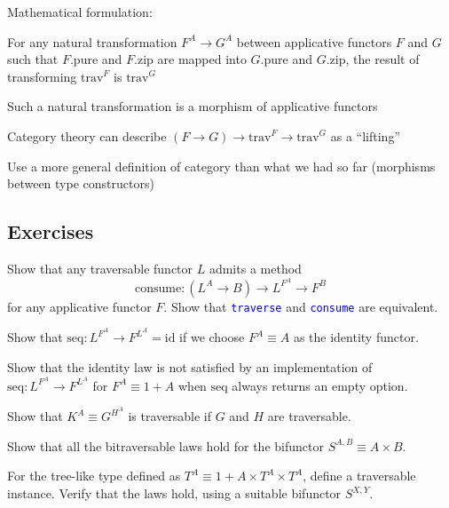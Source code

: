 Mathematical formulation:

For any natural transformation $F^{A}\rightarrow G^{A}$ between applicative
functors $F$ and $G$ such that $F.\text{pure}$ and $F.\text{zip}$
are mapped into $G.\text{pure}$ and $G.\text{zip}$, the result of
transforming $\text{trav}^{F}$ is $\text{trav}^{G}$

Such a natural transformation is a morphism of applicative functors

Category theory can describe {\footnotesize{}$\left(F\rightarrow G\right)\rightarrow\text{trav}^{F}\rightarrow\text{trav}^{G}$}
as a ``lifting''

Use a more general definition of category than what we had so far
(morphisms between type constructors)


\subsection{Exercises}

{\footnotesize{}\vspace{-0.15cm}Show that any traversable functor
$L$ admits a method 
\[
\text{consume}:(L^{A}\rightarrow B)\rightarrow L^{F^{A}}\rightarrow F^{B}
\]
for any applicative functor $F$. Show that }\texttt{\textcolor{blue}{\footnotesize{}traverse}}{\footnotesize{}
and }\texttt{\textcolor{blue}{\footnotesize{}consume}}{\footnotesize{}
are equivalent.}{\footnotesize\par}

{\footnotesize{}Show that $\text{seq}:L^{F^{A}}\rightarrow F^{L^{A}}=\text{id}$
if we choose $F^{A}\equiv A$ as the identity functor. }{\footnotesize\par}

{\footnotesize{}Show that the identity law is not satisfied by an
implementation of $\text{seq}:L^{F^{A}}\rightarrow F^{L^{A}}$ for
$F^{A}\equiv1+A$ when $\text{seq}$ always returns an empty option.}{\footnotesize\par}

{\footnotesize{}Show that $K^{A}\equiv G^{H^{A}}$ is traversable
if $G$ and $H$ are traversable.}{\footnotesize\par}

{\footnotesize{}Show that all the bitraversable laws hold for the
bifunctor $S^{A,B}\equiv A\times B$.}{\footnotesize\par}

{\footnotesize{}For the tree-like type defined as $T^{A}\equiv1+A\times T^{A}\times T^{A}$,
define a traversable instance. Verify that the laws hold, using a
suitable bifunctor $S^{X,Y}$.}{\footnotesize\par}

